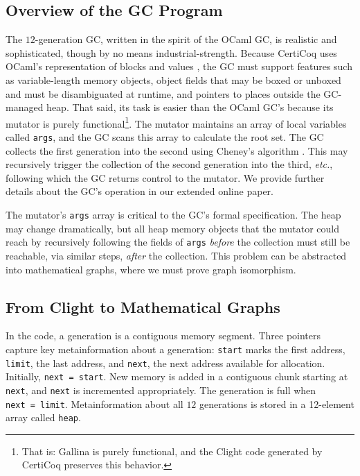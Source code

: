 \documentclass[acmsmall,screen]{acmart}
\newcommand{\li}[1]{{\texttt{\small #1}}}
\begin{document}
\subsection{Overview of the GC Program}
\label{sec:gcbackground}

The $12$-generation GC, written in the spirit of the OCaml GC,
is realistic and sophisticated, though by no means
industrial-strength.
Because CertiCoq uses OCaml's representation of blocks and
values \cite{realworldocaml}, the GC must support features such as
variable-length memory objects, object fields that may be boxed
or unboxed and must be disambiguated at runtime, and pointers to places
outside the GC-managed heap.
That said, its task is easier than the OCaml GC's because
its mutator is purely functional\footnote{That is: Gallina is purely functional, and
the Clight code generated by CertiCoq preserves this behavior.}.
The mutator maintains an array of
local variables called \li{args}, and the GC scans this array to
calculate the root set. The GC collects the first generation
into the second using Cheney's algorithm \cite{cheney:gc}.
This may recursively trigger the collection of the second generation
into the third, \emph{etc.}, following which the GC returns control to the mutator. 
We provide further details about the GC's operation in 
our extended online paper.


The mutator's \li{args} array is critical to the GC's formal specification.
The heap may change dramatically, but all heap memory objects 
that the mutator could reach by recursively
following the fields of \li{args} \emph{before} the collection 
must still be reachable, via similar steps, \emph{after} the collection.  This problem can be abstracted 
into mathematical graphs, where we must prove graph isomorphism.

\subsection{From Clight to Mathematical Graphs}
\label{sec:movetomathgraph}
In the code, a generation is a contiguous memory segment. 
Three pointers capture key metainformation about a generation:
\li{start} marks the first address, \li{limit},
the last address, and \li{next}, the next address available for 
allocation.  
Initially, \li{next~=~start}. 
New memory is added in a contiguous chunk starting 
at \li{next}, and \li{next} is
incremented appropriately. 
The generation is full when \li{next~=~limit}.
Metainformation about all $12$ generations is stored in 
a 12-element array called \li{heap}.
	
\end{document}
